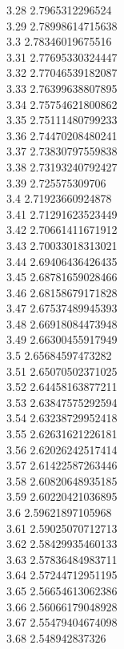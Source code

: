 {3.28	2.7965312296524\\
3.29	2.78998614715638\\
3.3	2.78346019675516\\
3.31	2.77695330324447\\
3.32	2.77046539182087\\
3.33	2.76399638807895\\
3.34	2.75754621800862\\
3.35	2.75111480799233\\
3.36	2.74470208480241\\
3.37	2.73830797559838\\
3.38	2.73193240792427\\
3.39	2.725575309706\\
3.4	2.71923660924878\\
3.41	2.71291623523449\\
3.42	2.70661411671912\\
3.43	2.70033018313021\\
3.44	2.69406436426435\\
3.45	2.68781659028466\\
3.46	2.68158679171828\\
3.47	2.67537489945393\\
3.48	2.66918084473948\\
3.49	2.66300455917949\\
3.5	2.65684597473282\\
3.51	2.65070502371025\\
3.52	2.64458163877211\\
3.53	2.63847575292594\\
3.54	2.63238729952418\\
3.55	2.62631621226181\\
3.56	2.62026242517414\\
3.57	2.61422587263446\\
3.58	2.60820648935185\\
3.59	2.60220421036895\\
3.6	2.59621897105968\\
3.61	2.59025070712713\\
3.62	2.58429935460133\\
3.63	2.57836484983711\\
3.64	2.57244712951195\\
3.65	2.56654613062386\\
3.66	2.56066179048928\\
3.67	2.55479404674098\\
3.68	2.548942837326\\
}
